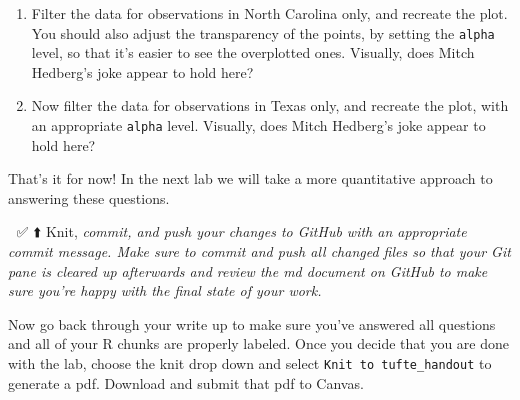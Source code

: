 \documentclass[
]{article}
\begin{document}
\begin{enumerate}
\def\labelenumi{\arabic{enumi}.}
\setcounter{enumi}{10}
\item
  Filter the data for observations in North Carolina only, and recreate
  the plot. You should also adjust the transparency of the points, by
  setting the \texttt{alpha} level, so that it's easier to see the
  overplotted ones. Visually, does Mitch Hedberg's joke appear to hold
  here?
\item
  Now filter the data for observations in Texas only, and recreate the
  plot, with an appropriate \texttt{alpha} level. Visually, does Mitch
  Hedberg's joke appear to hold here?
\end{enumerate}

That's it for now! In the next lab we will take a more quantitative
approach to answering these questions.

🧶 ✅ ⬆️ Knit, \emph{commit, and push your changes to GitHub with an
appropriate commit message. Make sure to commit and push all changed
files so that your Git pane is cleared up afterwards and review the md
document on GitHub to make sure you're happy with the final state of
your work.}

Now go back through your write up to make sure you've answered all
questions and all of your R chunks are properly labeled. Once you decide
that you are done with the lab, choose the knit drop down and select
\texttt{Knit\ to\ tufte\_handout} to generate a pdf. Download and submit
that pdf to Canvas.
\end{document}

